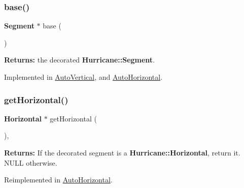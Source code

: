 \mbox{\label{classKatabatic_1_1AutoSegment_ade416d0483aefe986988fa89a7cf6fcf}} 
\subsubsection{\texorpdfstring{base()}{base()}\hspace{0.1cm}{\footnotesize\ttfamily [2/2]}}
{\footnotesize\ttfamily \textbf{ Segment} $\ast$ base (\begin{DoxyParamCaption}{ }\end{DoxyParamCaption})\hspace{0.3cm}{\ttfamily [pure virtual]}}

{\bfseries Returns\+:} the decorated \textbf{ Hurricane\+::\+Segment}. 

Implemented in \hyperlink{classKatabatic_1_1AutoVertical_a9e651c17b47f82166a02865c9296a2df}{Auto\+Vertical}, and \hyperlink{classKatabatic_1_1AutoHorizontal_a9e651c17b47f82166a02865c9296a2df}{Auto\+Horizontal}.

\mbox{\label{classKatabatic_1_1AutoSegment_a659b8ed90de679564924afe07af478de}} 
\subsubsection{\texorpdfstring{get\+Horizontal()}{getHorizontal()}}
{\footnotesize\ttfamily \textbf{ Horizontal} $\ast$ get\+Horizontal (\begin{DoxyParamCaption}{ }\end{DoxyParamCaption})\hspace{0.3cm}{\ttfamily [inline]}, {\ttfamily [virtual]}}

{\bfseries Returns\+:} If the decorated segment is a \textbf{ Hurricane\+::\+Horizontal}, return it. {\ttfamily N\+U\+LL} otherwise. 

Reimplemented in \hyperlink{classKatabatic_1_1AutoHorizontal_a659b8ed90de679564924afe07af478de}{Auto\+Horizontal}.

\mbox{\label{classKatabatic_1_1AutoSegment_ab6a809b6f3ef3cf5385fa35580e31e7a}} 
